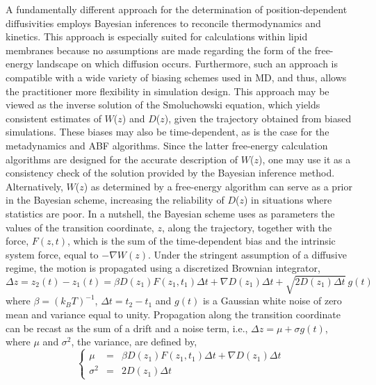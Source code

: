 A fundamentally different approach for the determination of position-dependent 
diffusivities employs Bayesian inferences to reconcile thermodynamics and kinetics\cite{Hummer2005,Turkcan2012,Comer2013}.  This approach is especially suited for calculations within lipid membranes
because no assumptions are made regarding the form of the free-energy landscape on which diffusion occurs.
Furthermore, such an approach
is compatible with a wide variety of biasing schemes used in MD,
and thus, allows the practitioner more flexibility in simulation design.
This approach may be viewed as the
inverse solution of the Smoluchowski equation, which yields consistent estimates
of $W$($z$) and $D$($z$), given the
trajectory obtained from biased simulations.
These biases may also be time-dependent, as is the case for
the metadynamics and ABF algorithms.
Since the latter free-energy calculation algorithms are
designed for the accurate description of $W$($z$), one may use it as a
consistency check of the solution provided by the Bayesian inference method.
Alternatively, $W$($z$) as determined by a free-energy algorithm can
serve as a prior in the Bayesian scheme, increasing the reliability of
$D$($z$) in situations where statistics are poor.
In a nutshell, the Bayesian scheme uses as parameters the values of
the transition coordinate, $z$, along the trajectory, together with the force, $F(z,t)$,
which is the sum of the time-dependent bias and the intrinsic system force, equal
to $-\nabla W(z)$. Under the stringent assumption of a diffusive regime, the 
motion is propagated using a discretized Brownian integrator,
%
\begin{equation}
 \Delta z = z_2(t) - z_1(t) = \beta D(z_1) F(z_1, t_1) \Delta t + \nabla D(z_1) \Delta t + \sqrt{2 D(z_1) \Delta t} \ g(t)
\label{Brownian}
\end{equation}
%
where $\beta = (k_B T)^{-1}$, $\Delta t = t_2 - t_1$ and $g(t)$
is a Gaussian white noise of zero mean and variance equal to unity. Propagation along the
transition coordinate can be recast as the sum of a drift and a noise
term, i.e., $\Delta z = \mu + \sigma g(t)$, where
$\mu$ and $\sigma^2$, the variance, are defined by,
%
\begin{equation}
\left\{
\begin{array}{lcl}
\mu      & = & \beta D(z_1) F(z_1, t_1) \Delta t + \nabla D(z_1) \Delta t
\\
\sigma^2 & = & 2 D(z_1) \Delta t
\end{array}
\right.
\end{equation}
